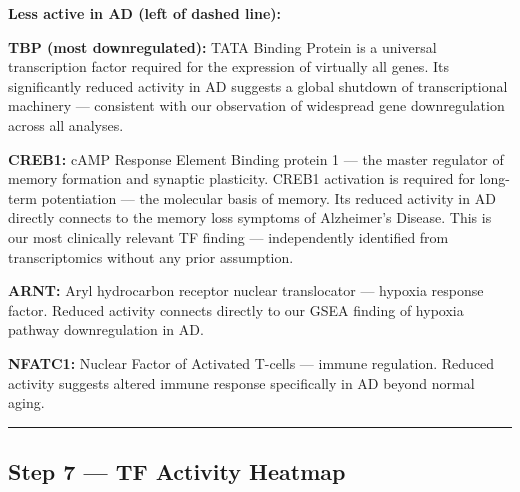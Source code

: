 \documentclass[
]{article}
\begin{document}
\textbf{Less active in AD (left of dashed line):}

\textbf{TBP (most downregulated):} TATA Binding Protein is a universal
transcription factor required for the expression of virtually all genes.
Its significantly reduced activity in AD suggests a global shutdown of
transcriptional machinery --- consistent with our observation of
widespread gene downregulation across all analyses.

\textbf{CREB1:} cAMP Response Element Binding protein 1 --- the master
regulator of memory formation and synaptic plasticity. CREB1 activation
is required for long-term potentiation --- the molecular basis of
memory. Its reduced activity in AD directly connects to the memory loss
symptoms of Alzheimer's Disease. This is our most clinically relevant TF
finding --- independently identified from transcriptomics without any
prior assumption.

\textbf{ARNT:} Aryl hydrocarbon receptor nuclear translocator ---
hypoxia response factor. Reduced activity connects directly to our GSEA
finding of hypoxia pathway downregulation in AD.

\textbf{NFATC1:} Nuclear Factor of Activated T-cells --- immune
regulation. Reduced activity suggests altered immune response
specifically in AD beyond normal aging.

\begin{center}\rule{0.5\linewidth}{0.5pt}\end{center}

\subsection{Step 7 --- TF Activity
Heatmap}\label{step-7-tf-activity-heatmap}
\end{document}
